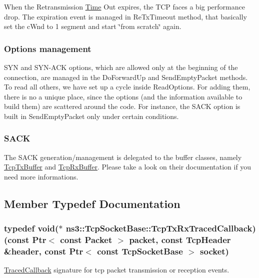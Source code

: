 When the Retransmission \hyperlink{classns3_1_1Time}{Time} Out expires, the T\+CP faces a big performance drop. The expiration event is managed in Re\+Tx\+Timeout method, that basically set the c\+Wnd to 1 segment and start \char`\"{}from scratch\char`\"{} again.

\subsubsection*{Options management }

S\+YN and S\+Y\+N-\/\+A\+CK options, which are allowed only at the beginning of the connection, are managed in the Do\+Forward\+Up and Send\+Empty\+Packet methods. To read all others, we have set up a cycle inside Read\+Options. For adding them, there is no a unique place, since the options (and the information available to build them) are scattered around the code. For instance, the S\+A\+CK option is built in Send\+Empty\+Packet only under certain conditions.

\subsubsection*{S\+A\+CK }

The S\+A\+CK generation/management is delegated to the buffer classes, namely \hyperlink{classns3_1_1TcpTxBuffer}{Tcp\+Tx\+Buffer} and \hyperlink{classns3_1_1TcpRxBuffer}{Tcp\+Rx\+Buffer}. Please take a look on their documentation if you need more informations. 

\subsection{Member Typedef Documentation}
\subsubsection[{\texorpdfstring{Tcp\+Tx\+Rx\+Traced\+Callback}{TcpTxRxTracedCallback}}]{\setlength{\rightskip}{0pt plus 5cm}typedef void($\ast$  ns3\+::\+Tcp\+Socket\+Base\+::\+Tcp\+Tx\+Rx\+Traced\+Callback) (const {\bf Ptr}$<$ const {\bf Packet} $>$ packet, const {\bf Tcp\+Header} \&header, const {\bf Ptr}$<$ const {\bf Tcp\+Socket\+Base} $>$ socket)}\hypertarget{classns3_1_1TcpSocketBase_adf72372176d8a74b77ddc5a54db02048}{}\label{classns3_1_1TcpSocketBase_adf72372176d8a74b77ddc5a54db02048}
\hyperlink{classns3_1_1TracedCallback}{Traced\+Callback} signature for tcp packet transmission or reception events.


